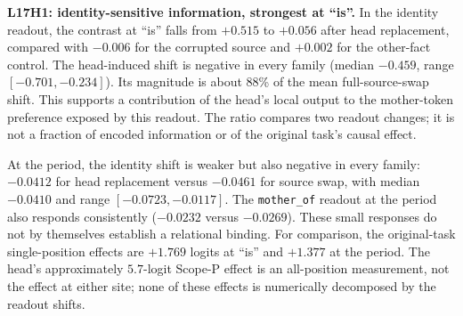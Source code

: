 \begin{table}[htbp]
\centering\small
\setlength{\tabcolsep}{4pt}
\caption{Controlled readout, family-level descriptives. Source swap uses the intact
corrupted prompt; head-site replaces only the selected head at the capture position.
The last column counts families with a negative head-site change after averaging
orders. The head-span condition is identical by construction at this capture layer
(see below). Values come from \texttt{readout\_family\_summary.csv}.}
\label{tab:readout}
\end{table}

\textbf{L17H1: identity-sensitive information, strongest at ``is''.} In the identity
readout, the contrast at ``is'' falls from $+0.515$ to $+0.056$ after head replacement,
compared with $-0.006$ for the corrupted source and $+0.002$ for the other-fact control.
The head-induced shift is negative in every family (median $-0.459$, range
$[-0.701,-0.234]$). Its magnitude is about 88\% of the mean full-source-swap shift.
This supports a contribution of the head's local output to the mother-token
preference exposed by this readout. The ratio compares two readout changes; it is
not a fraction of encoded information or of the original task's causal effect.

At the period, the identity shift is weaker but also negative in every family:
$-0.0412$ for head replacement versus $-0.0461$ for source swap, with median $-0.0410$
and range $[-0.0723,-0.0117]$. The \texttt{mother\_of} readout at the period also
responds consistently ($-0.0232$ versus $-0.0269$). These small responses do not by
themselves establish a relational binding. For comparison, the original-task
single-position effects are $+1.769$ logits at ``is'' and $+1.377$ at the period.
The head's approximately $5.7$-logit Scope-P effect is an all-position measurement,
not the effect at either site; none of these effects is numerically decomposed by
the readout shifts.

